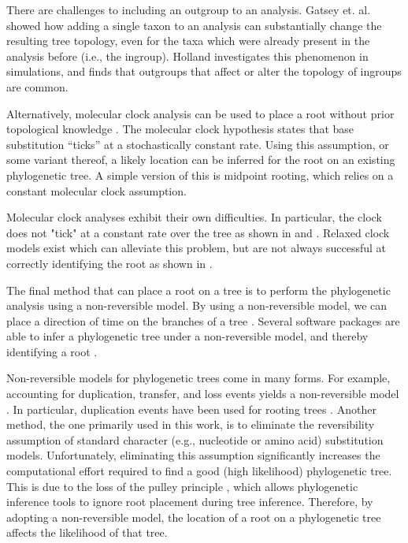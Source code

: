 \documentclass{article}
\begin{document}
There are challenges to including an outgroup to an analysis.  Gatsey et. al.
\cite{gatesy_how_2007} showed how adding a single taxon to an analysis can
substantially change the resulting tree topology, even for the taxa which were
already present in the analysis before (i.e., the ingroup).  Holland
\cite{holland_outgroup_2003} investigates this phenomenon in simulations, and
finds that outgroups that affect or alter the topology of ingroups are common.

Alternatively, molecular clock analysis can be used to place a root without
prior topological knowledge \cite{yang_computational_2006}.  The molecular clock
hypothesis states that base substitution ``ticks'' at a stochastically constant
rate.  Using this assumption, or some variant thereof, a likely location can be
inferred for the root on an existing phylogenetic tree.  A simple version of
this is midpoint rooting, which relies on a constant molecular clock assumption.

Molecular clock analyses exhibit their own difficulties. In particular, the
clock does not "tick" at a constant rate over the tree as shown in
\cite{li_molecular_1987} and \cite{steiper_primate_2006}. Relaxed clock models
exist which can alleviate this problem, but are not always successful at
correctly identifying the root as shown in \cite{battistuzzi_performance_2010}.

The final method that can place a root on a tree is to perform the phylogenetic
analysis using a non-reversible model. By using a non-reversible model, we can
place a direction of time on the branches of a tree \cite{yap_rooting_2005}.
Several software packages are able to infer a phylogenetic tree under a
non-reversible model, and thereby identifying a root \cite{nguyen_iq-tree:_2015,
ronquist_mrbayes_2003}.

Non-reversible models for phylogenetic trees come in many forms.  For example,
accounting for duplication, transfer, and loss events yields a non-reversible
model \cite{morel_generax:_2019}.  In particular, duplication events have been
used for rooting trees \cite{emms_stride:_2017}.  Another method, the one
primarily used in this work, is to eliminate the reversibility assumption of
standard character (e.g., nucleotide or amino acid) substitution models.
Unfortunately, eliminating this assumption significantly increases the
computational effort required to find a good (high likelihood) phylogenetic
tree.  This is due to the loss of the pulley principle
\cite{felsenstein_evolutionary_1981}, which allows phylogenetic inference tools
to ignore root placement during tree inference.  Therefore, by adopting a
non-reversible model, the location of a root on a phylogenetic tree affects the
likelihood of that tree.
\end{document}
